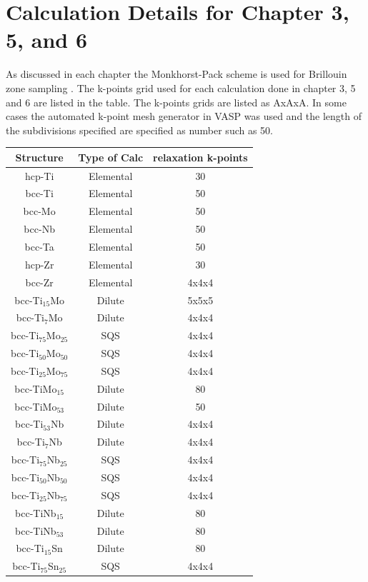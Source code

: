 
\section*{Calculation Details for Chapter 3, 5, and 6}
As discussed in each chapter the Monkhorst-Pack scheme is used for Brillouin zone sampling \cite{Kresse1996,Monkhorst1976a}. The k-points grid used for each calculation done in chapter 3, 5 and 6 are listed in the table. The k-points grids are listed as AxAxA. In some cases the automated k-point mesh generator in VASP was used and the length of the subdivisions specified are specified as number such as 50. 

\begin{longtable}[H]{ c c c }
	\hline
	Structure & Type of Calc & relaxation k-points\\
	\hline
	\endhead
	\hline
	\endfoot
	hcp-Ti & Elemental & 30 \\
	bcc-Ti & Elemental & 50 \\
	bcc-Mo & Elemental & 50 \\
	bcc-Nb & Elemental & 50 \\
	bcc-Ta & Elemental & 50 \\
	hcp-Zr & Elemental & 30 \\
	bcc-Zr & Elemental & 4x4x4 \\
	bcc-Ti$_{15}$Mo & Dilute & 5x5x5 \\
	bcc-Ti$_{7}$Mo & Dilute & 4x4x4\\
	bcc-Ti$_{75}$Mo$_{25}$ & SQS & 4x4x4\\
	bcc-Ti$_{50}$Mo$_{50}$ & SQS & 4x4x4\\
	bcc-Ti$_{25}$Mo$_{75}$ & SQS & 4x4x4\\
	bcc-TiMo$_{15}$ & Dilute & 80\\
	bcc-TiMo$_{53}$ & Dilute & 50\\
	bcc-Ti$_{53}$Nb & Dilute & 4x4x4\\
	bcc-Ti$_{7}$Nb & Dilute & 4x4x4\\ 
	bcc-Ti$_{75}$Nb$_{25}$ & SQS & 4x4x4\\
	bcc-Ti$_{50}$Nb$_{50}$ & SQS & 4x4x4\\
	bcc-Ti$_{25}$Nb$_{75}$ & SQS & 4x4x4\\
	bcc-TiNb$_{15}$ & Dilute & 80\\
	bcc-TiNb$_{53}$ & Dilute & 80\\
	bcc-Ti$_{15}$Sn & Dilute & 80\\
	bcc-Ti$_{75}$Sn$_{25}$ & SQS & 4x4x4\\

\end{longtable}
